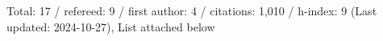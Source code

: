 Total: 17 / refereed: 9 / first author: 4 / citations: 1,010 / h-index: 9 (Last updated: 2024-10-27), List attached below